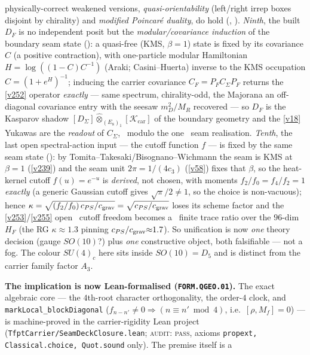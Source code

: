 \documentclass[11pt,a4paper]{article}
\begin{document}
\begin{keybox}
physically-correct weakened versions, \emph{quasi-orientability} (left/right irrep boxes disjoint by
chirality) and \emph{modified Poincar\'e duality}, do hold (,
).
\emph{Ninth}, the built $D_F$ is no independent posit but the \emph{modular/covariance induction} of the
boundary seam state (): a quasi-free (KMS, $\beta{=}1$) state is
fixed by its covariance $C$ (a positive contraction), with one-particle modular Hamiltonian
$H=\log((1{-}C)C^{-1})$ (Araki; Casini--Huerta) inverse to the KMS occupation $C=(1{+}e^{H})^{-1}$; inducing
the carrier covariance $C_F=P_F C_\Sigma P_F$ returns the \vref{v252} operator \emph{exactly} --- same
spectrum, chirality-odd, the Majorana an off-diagonal covariance entry with the seesaw $m_D^2/M_R$ recovered
--- so $D_F$ is the Kasparov shadow $[D_\Sigma]\widehat\otimes_{(E_8)_1}[\mathcal K_{\mathrm{car}}]$ of the
boundary geometry and the \vref{v18} Yukawas are the \emph{readout} of $C_\Sigma$, \mE\ modulo the one \mO\
seam realisation.
\emph{Tenth}, the last open spectral-action input --- the cutoff function $f$ --- is fixed by the same seam
state (\veri{v259\_modular\_cutoff\_kappa.py}): by Tomita--Takesaki/Bisognano--Wichmann the seam is KMS at
$\beta{=}1$ (\vref{v239}) and the seam unit $2\pi{=}1/(4c_3)$ (\vref{v58}) fixes that $\beta$, so the
heat-kernel cutoff $f(u)=e^{-u}$ is \emph{derived}, not chosen, with moments $f_2/f_0=f_4/f_2=1$
\emph{exactly} (a generic Gaussian cutoff gives $\sqrt\pi/2\neq1$, so the choice is non-vacuous); hence
$\kappa=\sqrt{(f_2/f_0)\,c_{PS}/c_{\rm grav}}=\sqrt{c_{PS}/c_{\rm grav}}$ loses its scheme factor and the
\vref{v253}/\vref{v255} open \mO\ cutoff freedom becomes a \mC\ finite trace ratio over the $96$-dim $H_F$
(the RG $\kappa{\approx}1.3$ pinning $c_{PS}/c_{\rm grav}{\approx}1.7$).
So
unification is now \emph{one} theory decision (gauge $SO(10)$?) plus \emph{one} constructive object, both
falsifiable --- not a fog. The colour $SU(4)_c$ here sits inside $SO(10){=}D_5$ and is distinct from the
carrier family factor $A_3$.
\par\smallskip\noindent\textbf{The implication is now Lean-formalised (\texttt{FORM.QGEO.01}).} The exact
algebraic core --- the $4$th-root character orthogonality, the order-$4$ clock, and
\texttt{markLocal\_blockDiagonal} ($f_{n-n'}\neq0\Rightarrow(n\equiv n'\bmod4)$, i.e.\ $[\rho,M_f]=0$) ---
is machine-proved in the carrier-rigidity Lean project (\texttt{TfptCarrier/SeamDeckClosure.lean};
\textsc{audit: pass}, axioms \texttt{propext, Classical.choice, Quot.sound} only). The premise itself is a

\end{keybox}
\end{document}
